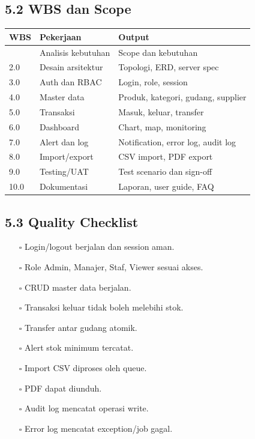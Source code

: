 \documentclass[
]{article}
\providecommand{\tightlist}{%
  \setlength{\itemsep}{0pt}\setlength{\parskip}{0pt}}
\begin{document}
\subsection{5.2 WBS dan Scope}\label{52-wbs-dan-scope}

\begin{longtable}[]{@{}P{0.20\textwidth}P{0.26\textwidth}P{0.50\textwidth}@{}}
\toprule\noalign{}
WBS & Pekerjaan & Output \\
\midrule\noalign{}
\endhead
\bottomrule\noalign{}
 & Analisis kebutuhan & Scope dan kebutuhan \\
2.0 & Desain arsitektur & Topologi, ERD, server spec \\
3.0 & Auth dan RBAC & Login, role, session \\
4.0 & Master data & Produk, kategori, gudang, supplier \\
5.0 & Transaksi & Masuk, keluar, transfer \\
6.0 & Dashboard & Chart, map, monitoring \\
7.0 & Alert dan log & Notification, error log, audit log \\
8.0 & Import/export & CSV import, PDF export \\
9.0 & Testing/UAT & Test scenario dan sign-off \\
10.0 & Dokumentasi & Laporan, user guide, FAQ \\
\end{longtable}

\subsection{5.3 Quality Checklist}\label{53-quality-checklist}

\begin{itemize}
\tightlist
\item[$\square$]
  Login/logout berjalan dan session aman.
\item[$\square$]
  Role Admin, Manajer, Staf, Viewer sesuai akses.
\item[$\square$]
  CRUD master data berjalan.
\item[$\square$]
  Transaksi keluar tidak boleh melebihi stok.
\item[$\square$]
  Transfer antar gudang atomik.
\item[$\square$]
  Alert stok minimum tercatat.
\item[$\square$]
  Import CSV diproses oleh queue.
\item[$\square$]
  PDF dapat diunduh.
\item[$\square$]
  Audit log mencatat operasi write.
\item[$\square$]
  Error log mencatat exception/job gagal.
\end{itemize}
\end{document}
